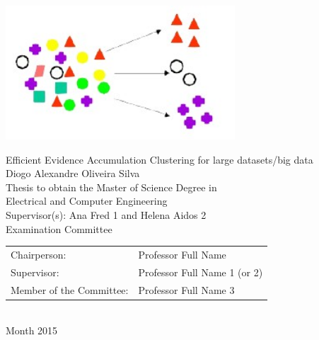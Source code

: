 \begin{center}
%
\vspace{2.5cm}
\includegraphics[height=50mm]{Figures/clustering.jpg}

\vspace{1.0cm}
{\FontLb Efficient Evidence Accumulation Clustering for large datasets/big data} \\
\vspace{2.7cm}
{\FontMb Diogo Alexandre Oliveira Silva} \\
\vspace{2.0cm}
{\FontSn Thesis to obtain the Master of Science Degree in} \\
\vspace{0.3cm}
{\FontLb Electrical and Computer Engineering} \\
\vspace{1.1cm}
{\FontSn Supervisor(s): Ana Fred 1 and Helena Aidos 2} \\
\vspace{1.1cm}
{\FontMb Examination Committee} \\
\vspace{0.3cm}
{\FontSn %
\begin{tabular}{ll}
Chairperson: & Professor Full Name \\
Supervisor: & Professor Full Name 1 (or 2) \\
Member of the Committee: & Professor Full Name 3
\end{tabular} } \\
\vspace{1.5cm}
{\FontMb Month 2015} \\
%
\end{center}

\cleardoublepage

